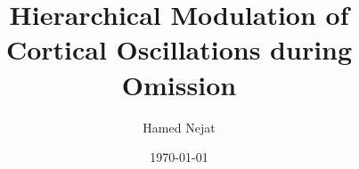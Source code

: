 \documentclass{article}
\begin{document}
\title{Hierarchical Modulation of Cortical Oscillations during Omission}
\author{Hamed Nejat}
\date{\today}
\maketitle






% 
\end{document}

